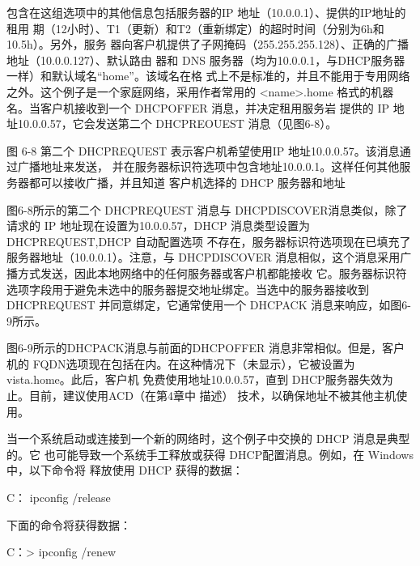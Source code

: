 包含在这组选项中的其他信息包括服务器的IP 地址（10.0.0.1）、提供的IP地址的租用
期（12小时）、T1（更新）和T2（重新绑定）的超时时间（分别为6h和10.5h）。另外，服务
器向客户机提供了子网掩码（255.255.255.128）、正确的广播地址（10.0.0.127）、默认路由
器和 DNS 服务器（均为10.0.0.1，与DHCP服务器一样）和默认域名“home”。该域名在格
式上不是标准的，并且不能用于专用网络之外。这个例子是一个家庭网络，采用作者常用的
<name>.home 格式的机器名。当客户机接收到一个 DHCPOFFER 消息，并决定租用服务岩
提供的 IP 地址10.0.0.57，它会发送第二个 DHCPREOUEST 消息（见图6-8）。

图 6-8
第二个 DHCPREQUEST 表示客户机希望使用IP 地址10.0.0.57。该消息通过广播地址来发送，
并在服务器标识符选项中包含地址10.0.0.1。这样任何其他服务器都可以接收广播，并且知道
客户机选择的 DHCP 服务器和地址

图6-8所示的第二个 DHCPREQUEST 消息与 DHCPDISCOVER消息类似，除了请求的
IP 地址现在设置为10.0.0.57，DHCP 消息类型设置为 DHCPREQUEST,DHCP 自动配置选项
不存在，服务器标识符选项现在已填充了服务器地址（10.0.0.1）。注意，与 DHCPDISCOVER
消息相似，这个消息采用广播方式发送，因此本地网络中的任何服务器或客户机都能接收
它。服务器标识符选项字段用于避免未选中的服务器提交地址绑定。当选中的服务器接收到
DHCPREQUEST 并同意绑定，它通常使用一个 DHCPACK 消息来响应，如图6-9所示。

图6-9所示的DHCPACK消息与前面的DHCPOFFER 消息非常相似。但是，客户机的
FQDN选项现在包括在内。在这种情况下（未显示），它被设置为vista.home。此后，客户机
免费使用地址10.0.0.57，直到 DHCP服务器失效为止。目前，建议使用ACD（在第4章中
描述） 技术，以确保地址不被其他主机使用。

当一个系统启动或连接到一个新的网络时，这个例子中交换的 DHCP 消息是典型的。它
也可能导致一个系统手工释放或获得 DHCP配置消息。例如，在 Windows 中，以下命令将
释放使用 DHCP 获得的数据：

C：\> ipconfig /release

下面的命令将获得数据：

C：> ipconfig /renew

